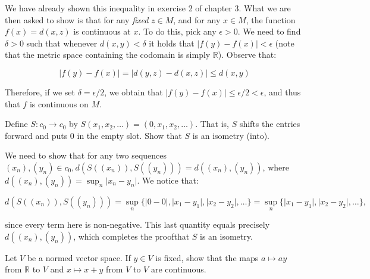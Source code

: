\begin{solution}
    
    We have already shown this inequality in exercise 2 of chapter 3.
    What we are then asked to show is that for any \textit{fixed} $z \in M$, and for any $x \in M$, the function $f(x) = d(x, z)$ is continuous at $x$.
    To do this, pick any $\epsilon > 0$.
    We need to find $\delta > 0$ such that whenever $d(x, y) < \delta$ it holds that $\lvert f(y) - f(x) \rvert < \epsilon$ (note that the metric space containing the codomain is simply $\mathbb{R}$).
    Observe that:

    \[\lvert f(y) - f(x) \rvert = \lvert d(y, z) - d(x, z) \rvert \leq d(x, y)\]

    Therefore, if we set $\delta = \epsilon/2$, we obtain that $\lvert f(y) - f(x) \rvert \leq \epsilon/2 < \epsilon$, and thus that $f$ is continuous on $M$.
\end{solution}

\begin{exercise}{23}
    Define $S: c_0 \rightarrow c_0$ by $S(x_1, x_2, \ldots) = (0, x_1, x_2, \ldots)$.
    That is, $S$ shifts the entries forward and puts 0 in the empty slot.
    Show that $S$ is an isometry (into).
\end{exercise}

\begin{solution}
    
    We need to show that for any two sequences $(x_n), (y_n) \in c_0, d(S((x_n)), S((y_n))) = d((x_n), (y_n))$, where $d((x_n), (y_n)) = \sup_{n} \lvert x_n - y_n \rvert$.
    We notice that:

    \[d(S((x_n)), S((y_n))) = \sup_{n} \{ \lvert 0 - 0 \rvert, \lvert x_1 - y_1 \rvert, \lvert x_2 - y_2 \rvert, \ldots\} = \sup_{n} \{ \lvert x_1 - y_1 \rvert , \lvert x_2 - y_2 \rvert, \ldots \},\]

    since every term here is non-negative.
    This last quantity equals precisely $d((x_n), (y_n))$, which completes the proofthat $S$ is an isometry.
\end{solution}

\begin{exercise}{24}
    Let $V$ be a normed vector space.
    If $y \in V$ is fixed, show that the maps $a \mapsto a y$ from $\mathbb{R}$ to $V$ and $x \mapsto x + y$ from $V$ to $V$ are continuous.
\end{exercise}

